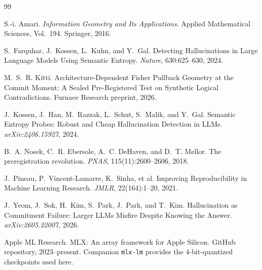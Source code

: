 \documentclass[10pt, letterpaper]{article}
\begin{document}
\begin{thebibliography}{99}

S.-i. Amari.
\newblock \emph{Information Geometry and Its Applications}.
\newblock Applied Mathematical Sciences, Vol.~194. Springer, 2016.

S.~Farquhar, J.~Kossen, L.~Kuhn, and Y.~Gal.
\newblock Detecting Hallucinations in Large Language Models Using
Semantic Entropy.
\newblock \emph{Nature}, 630:625--630, 2024.

M.~S.~R. Kitti.
\newblock Architecture-Dependent Fisher Pullback Geometry at the Commit
Moment: A Sealed Pre-Registered Test on Synthetic Logical
Contradictions.
\newblock Furnace Research preprint, 2026.

J.~Kossen, J.~Han, M.~Razzak, L.~Schut, S.~Malik, and Y.~Gal.
\newblock Semantic Entropy Probes: Robust and Cheap Hallucination
Detection in LLMs.
\newblock \emph{arXiv:2406.15927}, 2024.




B.~A. Nosek, C.~R. Ebersole, A.~C. DeHaven, and D.~T. Mellor.
\newblock The preregistration revolution.
\newblock \emph{PNAS}, 115(11):2600--2606, 2018.

J.~Pineau, P.~Vincent-Lamarre, K.~Sinha, et al.
\newblock Improving Reproducibility in Machine Learning Research.
\newblock \emph{JMLR}, 22(164):1--20, 2021.

J.~Yeom, J.~Sok, H.~Kim, S.~Park, J.~Park, and T.~Kim.
\newblock Hallucination as Commitment Failure: Larger LLMs Misfire
Despite Knowing the Answer.
\newblock \emph{arXiv:2605.22007}, 2026.

Apple ML Research.
\newblock MLX: An array framework for Apple Silicon.
\newblock GitHub repository, 2023--present. Companion \texttt{mlx-lm}
provides the 4-bit-quantized checkpoints used here.

\end{thebibliography}

\appendix
\end{document}
